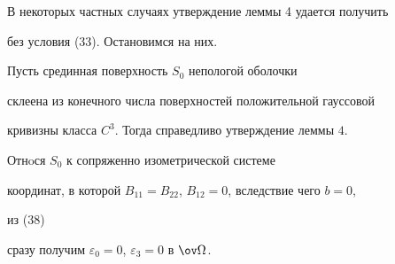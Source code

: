 

 


 


В некоторых частных случаях утверждение леммы 4 удается получить 


без условия (33). Остановимся на них. 





 


\begin{lem} 


Пусть срединная поверхность $S_0$ непологой оболочки 


склеена из конечного числа поверхностей положительной гауссовой 


кривизны класса $C^3$. Тогда справедливо утверждение леммы $4$. 


\end{lem} 





 


\begin{pf} 


Отнoся $S_0$ к сопряженно изометрической системе 


координат, в которой $B_{11}=B_{22}$, $B_{12}=0$, вследствие чего $b=0$, 


из (38) 


сразу получим $\varepsilon_0=0$, $\varepsilon_3=0$ в $\ov\Omega$. 


\end{pf} 


